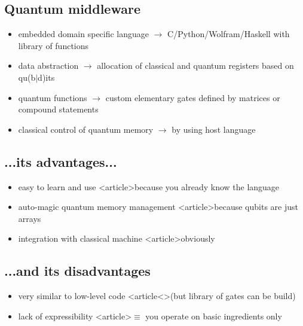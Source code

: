 \documentclass[a4paper,11pt]{article}
\begin{document}
\subsection{Quantum middleware}


\begin{itemize}
\item embedded domain specific language $\rightarrow$ 
C/Python/Wolfram/Haskell
with library of functions
\item data abstraction $\rightarrow$ allocation of classical and quantum 
registers based on qu(b$|$d)its
\item quantum functions $\rightarrow$ custom elementary gates defined by 
matrices or compound statements
\item classical control of quantum memory $\rightarrow$ by using host 
language
\end{itemize}


\subsection{...its advantages...}

\begin{itemize}
\item easy to learn and use <article>{because you already know 
the language}
\item auto-magic quantum memory management <article>{because 
qubits are just arrays}
\item integration with classical machine
<article>{obviously}
\end{itemize}


\subsection{...and its disadvantages}

\begin{itemize}
\item very similar to low-level code <article<>{(but library 
of gates can be build)}
\item lack of expressibility <article>{$\equiv$ you operate on 
basic ingredients only}
\end{itemize}
\end{document}
